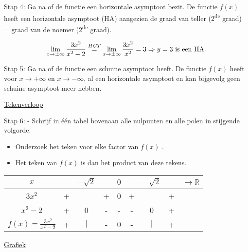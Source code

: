 \begin{voorbeeld}
Stap 4: Ga na of de functie een horizontale asymptoot bezit. De functie
$f(x)$ heeft een horizontale asymptoot (HA) aangezien de graad van
teller (2\textsuperscript{de} graad) = graad van de noemer (2\textsuperscript{de}
graad).

\begin{equation*}
\lim_{x\to\pm\infty}\frac{3x^{2}}{x^{2}-2}\overset{HGT}{=} \lim_{x\to\pm\infty}\frac{3x^{2}}{x^{2}}=3 \\
\Rightarrow y=3\text{ is een HA}.
\end{equation*}

Stap 5: Ga na of de functie een schuine asymptoot heeft. De functie
$f(x)$ heeft voor $x\rightarrow+\infty$ en $x\rightarrow-\infty$,
al een horizontale asymptoot en kan bijgevolg geen schuine asymptoot
meer hebben.

\underline{Tekenverloop}

Stap 6: - Schrijf in \'e\'en tabel bovenaan alle nulpunten en alle polen
in stijgende volgorde. 

\begin{itemize}
\item Onderzoek het teken voor elke factor van $f(x)$ . 
\item Het teken van $f(x)$ is dan het product van deze tekens.
\end{itemize}

\begin{center}
	\begin{tabular}{c||cccccccc} 
$x$ &  & $-\sqrt{2}$ &  & $0$ &  & $-\sqrt{2}$ &  & ${\displaystyle \longrightarrow\mathbb{R}}$\\
\hline 
${\displaystyle 3x^{2}}$ & + &  & + & 0 & + &  & + & \\
\hline 
${\displaystyle x^{2}-2}$ & + & 0 & - & - & - & 0 & + & \\
\hline 
${\displaystyle f(x)=\frac{3x^{2}}{x^{2}-2}}$ & + & $\mid$ & - & 0 & - & $\mid$ & + & \\
\end{tabular}
\end{center}

\underline{Grafiek}


\begin{figure}
\centering

\end{figure}


\end{voorbeeld}


